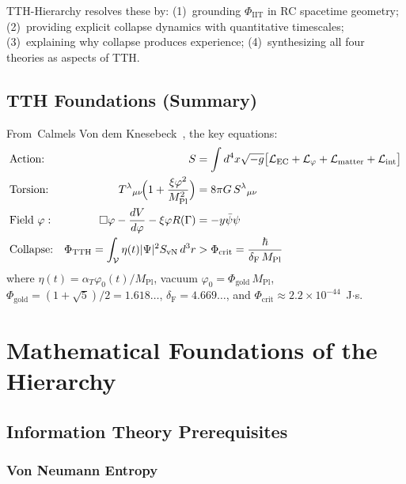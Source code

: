 \documentclass[12pt,a4paper]{article}
\newcommand{\MPl}{M_{\mathrm{Pl}}}
\newcommand{\phicrit}{\Phi_{\mathrm{crit}}}
\newcommand{\phiTTH}{\Phi_{\mathrm{TTH}}}
\newcommand{\phiIIT}{\Phi_{\mathrm{IIT}}}
\newcommand{\SvN}{S_{\mathrm{vN}}}
\newcommand{\etacoupl}{\eta(t)}
\newcommand{\alphaT}{\alpha_T}
\newcommand{\phigold}{\Phi_{\mathrm{gold}}}
\newcommand{\Feig}{\delta_{\mathrm{F}}}
\numberwithin{equation}{section}
\begin{document}
TTH-Hierarchy resolves these by: (1)~grounding $\phiIIT$ in RC spacetime geometry;
(2)~providing explicit collapse dynamics with quantitative timescales;
(3)~explaining why collapse produces experience;
(4)~synthesizing all four theories as aspects of TTH.

\subsection{TTH Foundations (Summary)}

From~Calmels Von dem Knesebeck~\citep{Calmels2026a}, the key equations:
\begin{align}
  &\text{Action:} & S &= \int d^4x\sqrt{-g}
  \bigl[\mathcal{L}_{\mathrm{EC}} + \mathcal{L}_\varphi + \mathcal{L}_{\mathrm{matter}}
  + \mathcal{L}_{\mathrm{int}}\bigr] \label{eq:action}\\
  &\text{Torsion:} & T^\lambda{}_{\mu\nu}\!\Bigl(1+\frac{\xi\varphi^2}{\MPl^2}\Bigr)
  &= 8\pi G\,S^\lambda{}_{\mu\nu} \label{eq:torsion}\\
  &\text{Field }\varphi: & \Box\varphi - \frac{dV}{d\varphi} - \xi\varphi R(\Gamma)
  &= -y\bar\psi\psi \label{eq:phi_eq}\\
  &\text{Collapse:} & \phiTTH = \int_\mathcal{V}\etacoupl|\Psi|^2\SvN\,d^3r
  &> \phicrit = \frac{\hbar}{\Feig\,\MPl} \label{eq:collapse}
\end{align}
where $\etacoupl = \alphaT\varphi_0(t)/\MPl$, vacuum $\varphi_0 = \phigold\,\MPl$,
$\phigold = (1+\sqrt5)/2 = 1.618\ldots$, $\Feig = 4.669\ldots$,
and $\phicrit \approx 2.2\times10^{-44}$~J$\cdot$s.

\section{Mathematical Foundations of the Hierarchy}
\label{sec:math}

\subsection{Information Theory Prerequisites}

\subsubsection{Von Neumann Entropy}
\end{document}
